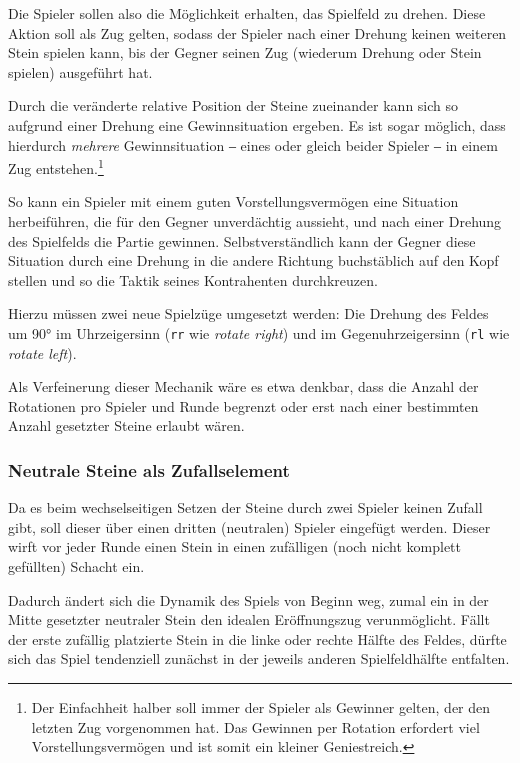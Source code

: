 \documentclass[a4paper,11pt,hidelinks]{scrartcl}
\begin{document}
Die Spieler sollen also die Möglichkeit erhalten, das Spielfeld zu drehen. Diese Aktion soll als Zug gelten, sodass der Spieler nach einer Drehung keinen weiteren Stein spielen kann, bis der Gegner seinen Zug (wiederum Drehung oder Stein spielen) ausgeführt hat.

Durch die veränderte relative Position der Steine zueinander kann sich so aufgrund einer Drehung eine Gewinnsituation ergeben. Es ist sogar möglich, dass hierdurch \textit{mehrere} Gewinnsituation ‒ eines oder gleich beider Spieler ‒ in einem Zug entstehen.\footnote{Der Einfachheit halber soll immer der Spieler als Gewinner gelten, der den letzten Zug vorgenommen hat. Das Gewinnen per Rotation erfordert viel Vorstellungsvermögen und ist somit ein kleiner Geniestreich.}

So kann ein Spieler mit einem guten Vorstellungsvermögen eine Situation herbeiführen, die für den Gegner unverdächtig aussieht, und nach einer Drehung des Spielfelds die Partie gewinnen. Selbstverständlich kann der Gegner diese Situation durch eine Drehung in die andere Richtung buchstäblich auf den Kopf stellen und so die Taktik seines Kontrahenten durchkreuzen.

Hierzu müssen zwei neue Spielzüge umgesetzt werden: Die Drehung des Feldes um 90° im Uhrzeigersinn (\texttt{rr} wie \textit{rotate right}) und im Gegenuhrzeigersinn (\texttt{rl} wie \textit{rotate left}).

Als Verfeinerung dieser Mechanik wäre es etwa denkbar, dass die Anzahl der Rotationen pro Spieler und Runde begrenzt oder erst nach einer bestimmten Anzahl gesetzter Steine erlaubt wären.

\subsubsection{Neutrale Steine als Zufallselement}

Da es beim wechselseitigen Setzen der Steine durch zwei Spieler keinen Zufall gibt, soll dieser über einen dritten (neutralen) Spieler eingefügt werden. Dieser wirft vor jeder Runde einen Stein in einen zufälligen (noch nicht komplett gefüllten) Schacht ein.

Dadurch ändert sich die Dynamik des Spiels von Beginn weg, zumal ein in der Mitte gesetzter neutraler Stein den idealen Eröffnungszug verunmöglicht. Fällt der erste zufällig platzierte Stein in die linke oder rechte Hälfte des Feldes, dürfte sich das Spiel tendenziell zunächst in der jeweils anderen Spielfeldhälfte entfalten.
\end{document}
